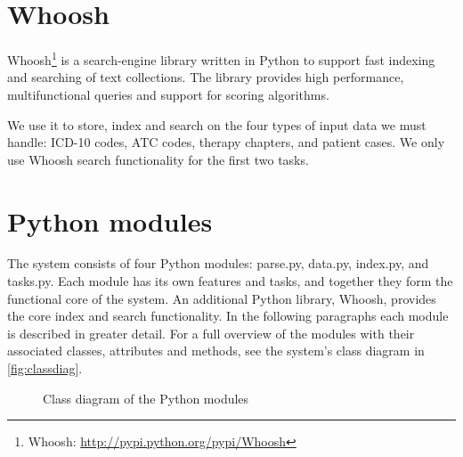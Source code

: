 \section{Whoosh}
Whoosh\footnote{Whoosh: \url{http://pypi.python.org/pypi/Whoosh}} is a
search-engine library written in Python to support fast indexing and searching
of text collections. The library provides high performance, multifunctional
queries and support for scoring algorithms.

We use it to store, index and search on the four types of input data we must
handle: ICD-10 codes, ATC codes, therapy chapters, and patient cases. We only
use Whoosh search functionality for the first two tasks.


\section{Python modules}
The system consists of four Python modules: parse.py, data.py, index.py, and tasks.py. Each module has its own features and tasks, and together they form the functional core of the system. An additional Python library, Whoosh, provides the core index and search functionality. In the following paragraphs each module is described in greater detail. For a full overview of the modules with their associated classes, attributes and methods, see the system's class diagram in \autoref{fig:classdiag}.

\begin{figure}[tbp]
	\noindent{}
	\caption{Class diagram of the Python modules\label{fig:classdiag}}
\end{figure}

